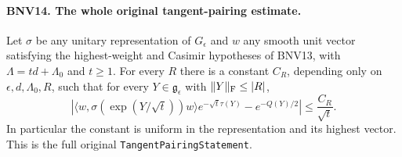 \paragraph{BNV14. The whole original tangent-pairing estimate.}
\label{claim:BNV14}
Let $\sigma$ be any unitary representation of $G_\epsilon$ and $w$ any
smooth unit vector satisfying the highest-weight and Casimir hypotheses
of BNV13, with $\Lambda=td+\Lambda_0$ and $t\ge1$.
For every $R$ there is a constant $C_R$, depending only on
$\epsilon,d,\Lambda_0,R$, such that for every
$Y\in\mathfrak g_\epsilon$ with $\|Y\|_{\rm F}\le |R|$,
\[
 \left|
 \langle w,\sigma(\exp(Y/\sqrt t))w\rangle
       e^{-\sqrt t\tau(Y)}-e^{-Q(Y)/2}
 \right|\le\frac{C_R}{\sqrt t}.
 \tag{BNV.22}
\]
In particular the constant is uniform in the representation and its
highest vector.  This is the full original \texttt{TangentPairingStatement}.

